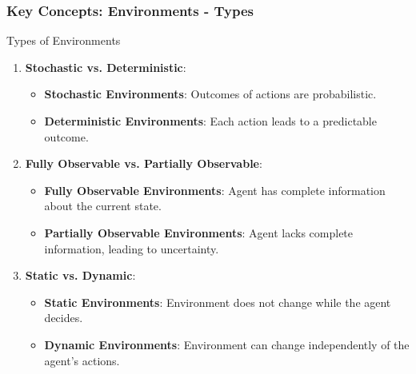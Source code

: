 \documentclass{beamer}
\begin{document}
\begin{frame}[fragile]
    \frametitle{Key Concepts: Environments - Types}
    \begin{block}{Types of Environments}
        \begin{enumerate}
            \item \textbf{Stochastic vs. Deterministic}:
            \begin{itemize}
                \item \textbf{Stochastic Environments}: Outcomes of actions are probabilistic.
                \item \textbf{Deterministic Environments}: Each action leads to a predictable outcome.
            \end{itemize}
            \item \textbf{Fully Observable vs. Partially Observable}:
            \begin{itemize}
                \item \textbf{Fully Observable Environments}: Agent has complete information about the current state.
                \item \textbf{Partially Observable Environments}: Agent lacks complete information, leading to uncertainty.
            \end{itemize}
            \item \textbf{Static vs. Dynamic}:
            \begin{itemize}
                \item \textbf{Static Environments}: Environment does not change while the agent decides.
                \item \textbf{Dynamic Environments}: Environment can change independently of the agent's actions.
            \end{itemize}
        \end{enumerate}
    \end{block}
\end{frame}
\end{document}
